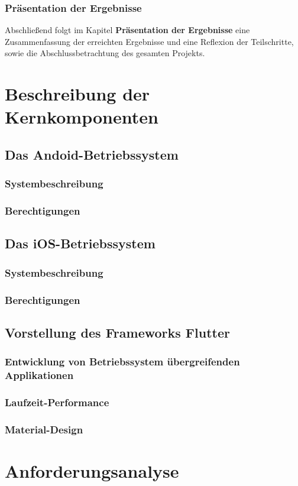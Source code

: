 \documentclass{scrreprt}
\begin{document}
\subsection{Präsentation der Ergebnisse}
Abschließend folgt im Kapitel \textbf{Präsentation der Ergebnisse} eine Zusammenfassung der erreichten Ergebnisse und eine Reflexion der Teilschritte, sowie die Abschlussbetrachtung des gesamten Projekts.
\chapter{Beschreibung der Kernkomponenten}
\section{Das Andoid-Betriebssystem}
\subsection{Systembeschreibung}
\subsection{Berechtigungen}
\section{Das iOS-Betriebssystem}
\subsection{Systembeschreibung}
\subsection{Berechtigungen}
\section{Vorstellung des Frameworks Flutter}
\subsection{Entwicklung von Betriebssystem übergreifenden Applikationen}
\subsection{Laufzeit-Performance}
\subsection{Material-Design}
\chapter{Anforderungsanalyse}
\end{document}
